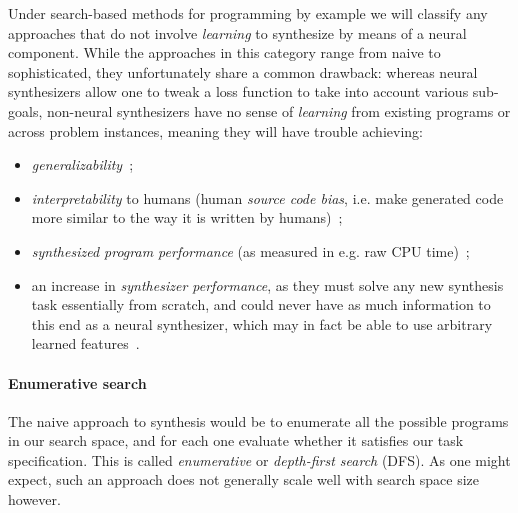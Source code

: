 \documentclass{article}
\begin{document}
Under search-based methods for programming by example we will classify any approaches that do not involve \emph{learning} to synthesize by means of a neural component.
While the approaches in this category range from naive to sophisticated,
they unfortunately share a common drawback:
whereas neural synthesizers allow one to tweak a loss function to take into account various sub-goals,
non-neural synthesizers have no sense of \emph{learning}
from existing programs or across problem instances,
meaning they will have trouble achieving:
\begin{itemize}
    \item \emph{generalizability}~\citep{nps};
    \item \emph{interpretability} to humans (human \emph{source code bias}, i.e. make generated code more similar to the way it is written by humans)~\citep{nps};
    \item \emph{synthesized program performance} (as measured in e.g. raw CPU time)~\citep{schkufza2016stochastic};
    \item an increase in \emph{synthesizer performance},
    as they must solve any new synthesis task essentially from scratch,
    and could never have as much information to this end as a neural synthesizer,
    which may in fact be able to use arbitrary learned features~\citep{odena2020learning}.
\end{itemize}

\paragraph{Enumerative search}

The naive approach to synthesis would be to enumerate all the possible programs in our search space,
and for each one evaluate whether it satisfies our task specification.
This is called \emph{enumerative} or \emph{depth-first search} (DFS).
As one might expect, such an approach does not generally scale well with search space size however.



\end{document}
